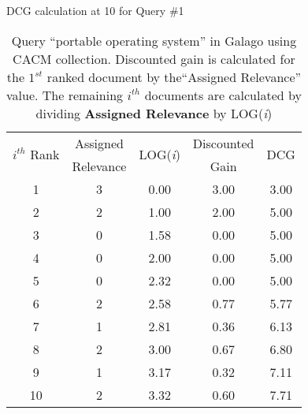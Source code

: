 \begin{table}[!htbp]
	\caption{DCG calculation at 10 for Query \#1} \label{tab:dcg-at10-cal}
	\begin{center}
	\vspace{-5mm}
		\begin{tabular}{ c | c | c | c | c}
			\toprule
			\multirow{2}{*}{\textit{$i^{th}$} Rank} & Assigned & \multirow{2}{*}{LOG(\textit{i})} & Discounted & \multirow{2}{*}{DCG}\\
			& Relevance & & Gain & \\
			\midrule
			1 & 3 & 0.00 & 3.00 & 3.00 \\
			2 & 2 & 1.00 & 2.00 & 5.00 \\
			3 & 0 & 1.58 & 0.00 & 5.00 \\
			4 & 0 & 2.00 & 0.00 & 5.00 \\
			5 & 0 & 2.32 & 0.00 & 5.00 \\
			6 & 2 & 2.58 & 0.77 & 5.77 \\
			7 & 1 & 2.81 & 0.36 & 6.13 \\
			8 & 2 & 3.00 & 0.67 & 6.80 \\
			9 & 1 & 3.17 & 0.32 & 7.11 \\
			10 & 2 & 3.32 & 0.60 & 7.71 \\
			\bottomrule
		\end{tabular}
	\caption*{\scriptsize Query ``portable operating system'' in Galago using CACM collection. Discounted gain is calculated for the $1^{st}$ ranked document by the``Assigned Relevance'' value. The remaining $i^{th}$ documents are calculated by dividing \textbf{Assigned Relevance} by LOG(\textit{i}) }
	 \end{center}
\end{table}
